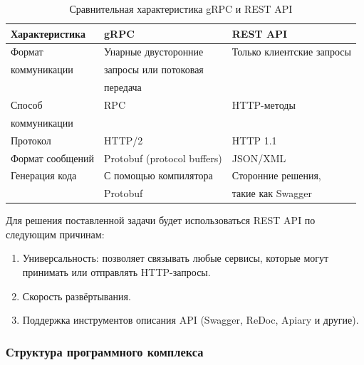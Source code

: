 \clearpage
\begin{table}[h]
	\begin{center}
		\captionsetup{justification=RaggedRight, singlelinecheck=off}
		\caption{Сравнительная характеристика gRPC и REST API}
		\label{tbl:compare}
		\begin{tabular}{|l|l|l|}
			\hline
			Характеристика & gRPC & REST API \\
			\hline
			Формат & Унарные двусторонние & Только клиентские запросы \\
			коммуникации & запросы или потоковая & \\
			 & передача & \\
			\hline
			Способ & RPC & HTTP-методы \\
			коммуникации & & \\
			\hline
			Протокол & HTTP/2 & HTTP 1.1 \\
			\hline
			Формат сообщений & Protobuf (protocol buffers) & JSON/XML \\
			\hline
			Генерация кода & С помощью компилятора & Сторонние решения, \\
			& Protobuf & такие как Swagger \\
			\hline
		\end{tabular}
	\end{center}
\end{table}

Для решения поставленной задачи будет использоваться REST API по следующим причинам:

\begin{enumerate}[label*=\arabic*.]
	\item Универсальность: позволяет связывать любые сервисы, которые могут принимать или отправлять HTTP-запросы.
	\item Скорость развёртывания.
	\item Поддержка инструментов описания API (Swagger, ReDoc, Apiary и другие).
	
\end{enumerate}




\subsubsection{Структура программного комплекса}

